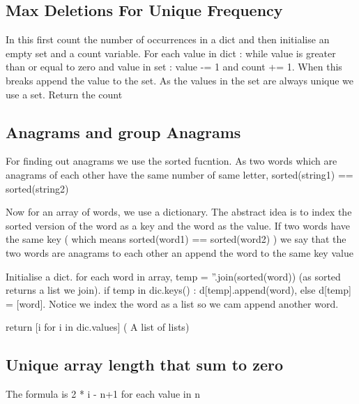 \documentclass{article}
\newcommand{\nd}{\noindent}
\begin{document}
\subsection{Max Deletions For Unique Frequency}
In this first count the number of occurrences in a dict and then initialise an empty set and a count variable. For each value in dict : while value is greater than or equal to zero and value in set : value -= 1 and count += 1. When this breaks append the value to the set. As the values in the set are always unique we use a set. Return the count 

\subsection{Anagrams and group Anagrams}
For finding out anagrams we use the sorted fucntion. As two words which are anagrams of each other have the same number of same letter, sorted(string1) == sorted(string2)

\nd Now for an array of words, we use a dictionary. The abstract idea is to index the sorted version of the word as a key and the word as the value. If two words have the same key ( which means sorted(word1) == sorted(word2) ) we say that the two words are anagrams to each other an append the word to the same key value 

\nd Initialise a dict. for each word in array, temp = ''.join(sorted(word)) (as sorted returns a list we join). if temp in dic.keys() : d[temp].append(word), else d[temp] = [word]. Notice we index the word as a list so we cam append another word. 

\nd return [i for i in dic.values] ( A list of lists) 

\subsection{Unique array length that sum to zero}
The formula is 2 * i - n+1 for each value in n 
\end{document}
